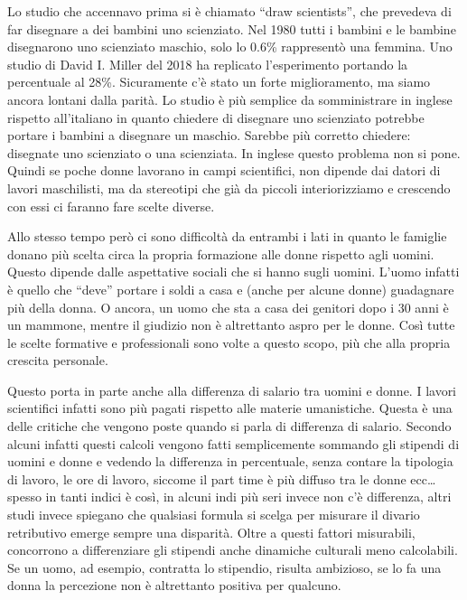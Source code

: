 \documentclass[12pt]{book} %
\begin{document}
\begin{mdframed}[linewidth=1pt]
\bigskip

Lo studio che accennavo prima si è chiamato “draw scientists”, che prevedeva di far disegnare a dei bambini uno
scienziato. Nel 1980 tutti i bambini e le bambine disegnarono uno scienziato maschio, solo lo 0.6\% rappresentò una
femmina. Uno studio di David I. Miller del
2018 ha replicato
l'esperimento portando la percentuale al 28\%. Sicuramente c'è stato un forte
miglioramento, ma siamo ancora lontani dalla parità. Lo studio è più semplice da somministrare in inglese rispetto
all'italiano in quanto chiedere di disegnare uno scienziato potrebbe portare i bambini a disegnare
un maschio. Sarebbe più corretto chiedere: disegnate uno scienziato o una scienziata. In inglese questo problema non si
pone. Quindi se poche donne lavorano in campi scientifici, non dipende dai datori di lavori maschilisti, ma da
stereotipi che già da piccoli interiorizziamo e crescendo con essi ci faranno fare scelte diverse.

Allo stesso tempo però ci sono difficoltà da entrambi i lati in quanto le famiglie donano più scelta circa la propria
formazione alle donne rispetto agli uomini. Questo dipende dalle aspettative sociali che si hanno sugli uomini.
L'uomo infatti è quello che “deve” portare i soldi a casa e (anche per alcune donne) guadagnare
più della donna. O ancora, un uomo che sta a casa dei genitori dopo i 30 anni è un mammone, mentre il giudizio non è
altrettanto aspro per le donne. Così tutte le scelte formative e professionali sono volte a questo scopo, più che alla
propria crescita
personale.


\bigskip

Questo porta in parte anche alla differenza di salario tra uomini e donne. I lavori scientifici infatti sono più pagati
rispetto alle materie umanistiche. Questa è una delle critiche che vengono poste quando si parla di differenza di
salario. Secondo alcuni infatti questi calcoli vengono fatti semplicemente sommando gli stipendi di uomini e donne e
vedendo la differenza in percentuale, senza contare la tipologia di lavoro, le ore di lavoro, siccome il part time è
più diffuso tra le donne ecc… spesso in tanti indici è così, in alcuni indi più seri invece non
c'è differenza, altri studi invece spiegano
che qualsiasi formula si scelga per misurare il divario retributivo emerge sempre una
disparità. Oltre a questi
fattori misurabili, concorrono a differenziare gli stipendi anche dinamiche culturali meno calcolabili. Se un uomo, ad
esempio, contratta lo stipendio, risulta ambizioso, se lo fa una donna la percezione non è altrettanto positiva per
qualcuno.



\end{mdframed}
\end{document}
